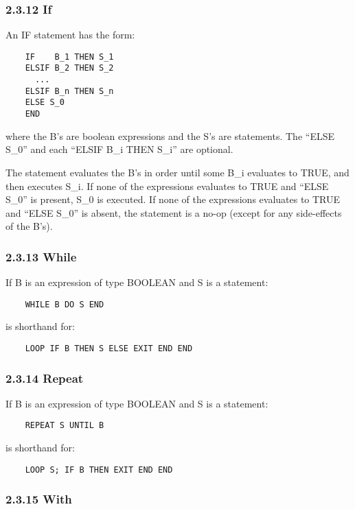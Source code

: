 \documentclass[10pt]{article}
\begin{document}
 
\subsubsection*{2.3.12 If}


  An IF statement has the form: 
\begin{verbatim}
    IF    B_1 THEN S_1
    ELSIF B_2 THEN S_2
      ...
    ELSIF B_n THEN S_n
    ELSE S_0
    END
\end{verbatim}



  where the B's are boolean expressions and the S's are statements. The ``ELSE S\_0'' and each ``ELSIF B\_i THEN S\_i'' are optional. 


  The statement evaluates the B's in order until some B\_i evaluates to TRUE, and then executes S\_i. If none of the expressions evaluates to TRUE and ``ELSE S\_0'' is present, S\_0 is executed. If none of the expressions evaluates to TRUE and ``ELSE S\_0'' is absent, the statement is a no-op (except for any side-effects of the B's). 


 
\subsubsection*{2.3.13 While}


  If B is an expression of type BOOLEAN and S is a statement: 
\begin{verbatim}
    WHILE B DO S END
\end{verbatim}
 is shorthand for: 
\begin{verbatim}
    LOOP IF B THEN S ELSE EXIT END END
\end{verbatim}



 
\subsubsection*{2.3.14 Repeat}


  If B is an expression of type BOOLEAN and S is a statement: 
\begin{verbatim}
    REPEAT S UNTIL B
\end{verbatim}
 is shorthand for: 
\begin{verbatim}
    LOOP S; IF B THEN EXIT END END
\end{verbatim}



 
\subsubsection*{2.3.15 With}
\end{document}
